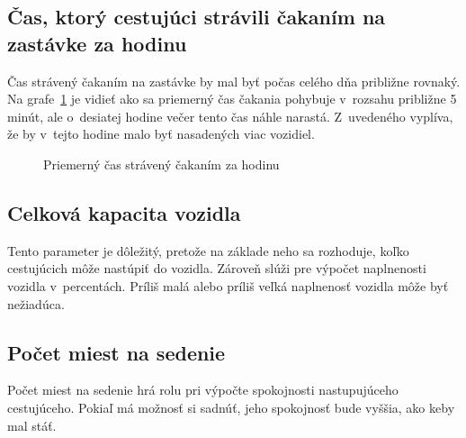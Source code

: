 \subsection*{Čas, ktorý cestujúci strávili čakaním na zastávke za hodinu}
Čas strávený čakaním na zastávke by mal byť počas celého dňa približne rovnaký.
Na grafe~\ref{fig:timeSpentWaitingPerHour} je vidieť ako sa priemerný čas čakania pohybuje v~rozsahu približne 5 minút, ale o~desiatej hodine večer tento čas náhle narastá.
Z~uvedeného vyplíva, že by v~tejto hodine malo byť nasadených viac vozidiel.
\begin{figure}[h]\label{fig:timeSpentWaitingPerHour}
  \centering
  \caption{Priemerný čas strávený čakaním za hodinu}
\end{figure}

\subsection*{Celková kapacita vozidla}
Tento parameter je dôležitý, pretože na základe neho sa rozhoduje, koľko cestujúcich môže nastúpiť do vozidla.
Zároveň slúži pre výpočet naplnenosti vozidla v~percentách.
Príliš malá alebo príliš veľká naplnenosť vozidla môže byť nežiadúca.

\subsection*{Počet miest na sedenie}
Počet miest na sedenie hrá rolu pri výpočte spokojnosti nastupujúceho cestujúceho.
Pokiaľ má možnosť si sadnúť, jeho spokojnosť bude vyššia, ako keby mal stáť.

